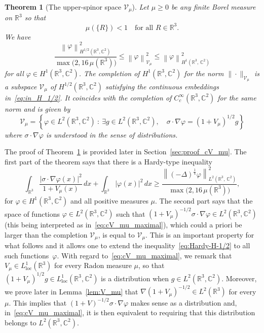 \documentclass[10pt]{amsart}
\newtheorem{theo}[cdrthm]{Theorem}
\theoremstyle{definition}
\newcommand{\R}{\mathbb{R}}
\newcommand{\C}{\mathbb{C}}
\newcommand{\cV}{\mathcal{V}}
\DeclareMathOperator{\loc}{loc}
\newcommand\1{{\ensuremath {\mathds 1} }}
\renewcommand\phi{\varphi}
\newcommand{\ii}{\infty}
\newcommand{\norm}[1]{ \left\| #1 \right\|}
\renewcommand{\geq}{\geqslant}
\renewcommand{\leq}{\leqslant}
\let\oldexists\exists
\renewcommand*{\exists}{\mathrel{\oldexists}}
\begin{document}
\begin{theo}[The upper-spinor space $\cV_\mu$]\label{thm:def_cV_mu}
Let $\mu\geq0$ be any finite Borel measure on $\R^3$ so that
\[
\mu(\{R\})<1\quad \text{for all }R\in\R^3.
\]
We have
\begin{equation}\label{eq:in_H_1/2}
\frac{\norm{\phi}^2_{H^{1/2}\left(\R^3,\C^2\right)}}{\max\big(2,16\,\mu\left(\R^3\right)\big)}\leq \norm{\phi}^2_{\cV_\mu}\leq \norm{\phi}^2_{H^{1}\left(\R^3,\,\C^2\right)}
\end{equation}
for all $\phi\in H^1(\R^3,\C^2)$. The completion of $H^1(\R^3,\C^2)$ for the norm $\|\cdot\|_{\cV_\mu}$ is a subspace $\cV_\mu$ of $H^{1/2}(\R^3,\C^2)$ satisfying the continuous embeddings in~\eqref{eq:in_H_1/2}. It coincides with the completion of $C^\ii_c(\R^3,\C^2)$ for the same norm and is given by
\begin{equation}\label{eq:cV_mu_maximal}
\cV_\mu=\left\{\phi\in L^2\left(\R^3,\C^2\right)\ :\ \exists g\in L^2\left(\R^3,\C^2\right),\quad \sigma\cdot \nabla\phi=\left(1+V_\mu\right)^{1/2}g\right\}
\end{equation}
where $\sigma\cdot \nabla\phi$ is understood in the sense of distributions.
\end{theo}

The proof of Theorem~\ref{thm:def_cV_mu} is provided later in Section~\ref{sec:proof_cV_mu}. The first part of the theorem says that there is a Hardy-type inequality
\begin{equation}\label{eq:Hardy-H-1/2}
\int_{\R^3}\frac{\left|\sigma\cdot \nabla\phi(x)\right|^2}{1+V_\mu(x)}\,dx+\int_{\R^3}|\phi(x)|^2\,dx\geq \frac{\norm{(-\Delta)^{\frac14}\phi}^2_{L^2\left(\R^3,\,\C^2\right)}}{\max\big(2,16\,\mu\left(\R^3\right)\big)},
\end{equation}
for $\phi\in H^1(\R^3,\C^2)$ and all positive measures $\mu$. The second part says that the space of functions $\phi\in L^2(\R^3,\C^2)$ such that $(1+V_\mu)^{-1/2}\sigma\cdot\nabla\phi\in L^2(\R^3,\C^2)$ (this being interpreted as in~\eqref{eq:cV_mu_maximal}), which could a priori be larger than the completion $\cV_\mu$, is equal to $\cV_\mu$. This is an important property for what follows and it allows one to extend the inequality~\eqref{eq:Hardy-H-1/2} to all such functions~$\phi$. With regard to~\eqref{eq:cV_mu_maximal}, we remark that $V_\mu\in L^1_{\loc}(\R^3)$ for every Radon measure $\mu$, so that $(1+V_\mu)^{1/2}g\in L^1_{\loc}(\R^3,\C^2)$ is a distribution when $g\in L^2(\R^3,\C^2)$. Moreover, we prove later in Lemma~\ref{lem:V_mu} that $\nabla (1+V_\mu)^{-1/2}\in L^2(\R^3)$ for every $\mu$. This implies that $(1+V)^{-1/2}\sigma\cdot\nabla\phi$ makes sense as a distribution and, in~\eqref{eq:cV_mu_maximal}, it is then equivalent to requiring that this distribution belongs to $L^2(\R^3,\C^2)$.
\end{document}
